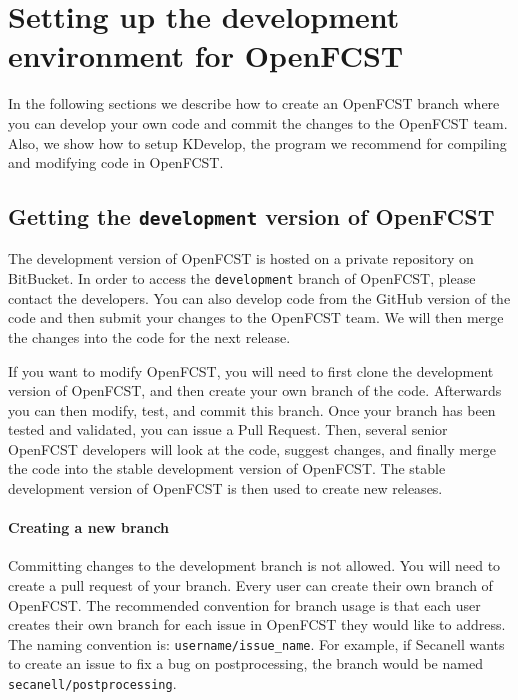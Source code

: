 \chapter{Setting up the development environment for OpenFCST}

In the following sections we describe how to create an OpenFCST branch where you can develop your own code and commit the changes to the OpenFCST team. Also, we show how to setup KDevelop, the program we recommend for compiling and modifying code in OpenFCST.

\section{Getting the \texttt{development} version of OpenFCST}

The development version of OpenFCST is hosted on a private repository on BitBucket. In order to access the \texttt{development} branch of OpenFCST, please contact the developers. You can also develop code from the GitHub version of the code and then submit your changes to the OpenFCST team. We will then merge the changes into the code for the next release.

If you want to modify OpenFCST, you will need to first clone the development version of OpenFCST, and then create your own branch of the code. Afterwards you can then modify, test, and commit this branch. Once your branch has been tested and validated, you can issue a Pull Request. Then, several senior OpenFCST developers will look at the code, suggest changes, and finally merge the code into the stable development version of OpenFCST. The stable development version of OpenFCST is then used to create new releases.

\subsubsection{Creating a new branch}

Committing changes to the development branch is not allowed. You will need to create a pull request of your branch. Every user can create their own branch of OpenFCST. The recommended convention for branch usage is that each user creates their own branch for each issue in OpenFCST they would like to address. The naming convention is: \texttt{username/issue\_name}. For example, if Secanell wants to create an issue to fix a bug on postprocessing, the branch would be named \texttt{secanell/postprocessing}.
 
